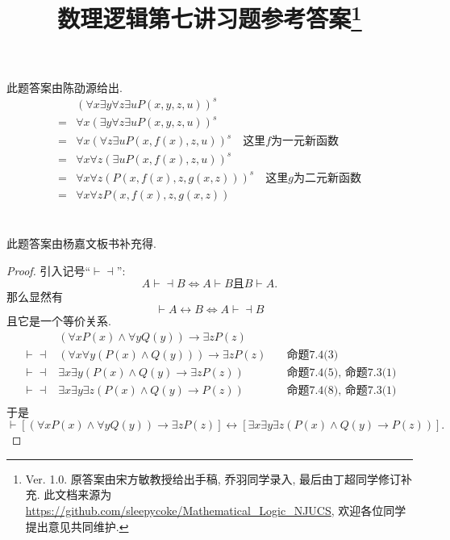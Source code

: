 \documentclass{article}
\newcommand{\vv}[0]{\vdash\dashv}
\begin{document}
\title{数理逻辑第七讲习题参考答案\footnote{Ver. 1.0. 原答案由宋方敏教授给出手稿, 乔羽同学录入, 最后由丁超同学修订补充. 此文档来源为{\url{https://github.com/sleepycoke/Mathematical_Logic_NJUCS}},
 欢迎各位同学提出意见共同维护. 
}}
\maketitle
\section{}
此题答案由陈劭源给出. 	
\begin{align*}
  &(\forall x \exists y \forall z \exists u P(x, y, z, u))^s \\
  =& \forall x (\exists y \forall z \exists u P(x, y, z, u))^s \\
  =& \forall x (\forall z \exists u P(x, f(x), z, u))^s\quad \text{这里$f$为一元新函数}\\
  =& \forall x \forall z (\exists u P(x, f(x), z, u))^s \\
  =& \forall x \forall z (P(x, f(x), z, g(x, z)))^s \quad \text{这里$g$为二元新函数}\\
  =& \forall x \forall z P(x, f(x), z, g(x, z))
\end{align*}

\section{}
此题答案由杨嘉文板书补充得.
\begin{proof}
引入记号``$\vv$'':
$$A \vv B \Leftrightarrow A\vdash B \text{且} B \vdash A. $$
那么显然有
$$\vdash A \leftrightarrow B \Leftrightarrow A\vv B $$
且它是一个等价关系. 
\begin{align*}
  &(\forall x P(x) \wedge \forall y Q(y)) \rightarrow \exists z P(z) \\
  \vv & (\forall x \forall y (P(x) \wedge Q(y))) \rightarrow \exists z P(z) \quad &\text{命题7.4(3)}\\
  \vv & \exists x \exists y (P(x) \wedge Q(y) \rightarrow \exists z P(z)) \quad &\text{命题7.4(5), 命题7.3(1)}\\
  \vv & \exists x \exists y \exists z (P(x) \wedge Q(y) \rightarrow P(z))\quad &\text{命题7.4(8), 命题7.3(1)}\\
\end{align*}
于是
$$\vdash [(\forall x P(x) \wedge \forall y Q(y)) \rightarrow \exists z P(z)]\leftrightarrow [\exists x \exists y \exists z (P(x) \wedge Q(y) \rightarrow P(z))].$$
\end{proof}
\end{document}
